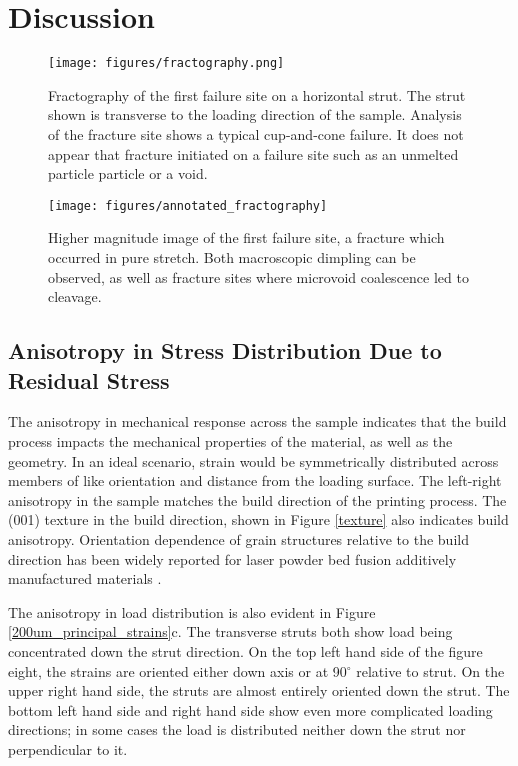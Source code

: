 \section{Discussion}

\begin{figure*}
	\texttt{[image: figures/fractography.png]}
	\caption{Fractography of the first failure site on a horizontal strut. The strut shown is transverse to the loading direction of the sample. Analysis of the fracture site shows a typical cup-and-cone failure. It does not appear that fracture initiated on a failure site such as an unmelted particle particle or a void.}
	\label{fractography}
\end{figure*}

\begin{figure*}
	\texttt{[image: figures/annotated\_fractography]}
	\caption{Higher magnitude image of the first failure site, a fracture which occurred in pure stretch. Both macroscopic dimpling can be observed, as well as fracture sites where microvoid coalescence led to cleavage.}
	\label{annofrac}
\end{figure*}

\subsection{Anisotropy in Stress Distribution Due to Residual Stress}
The anisotropy in mechanical response across the sample indicates that the build process impacts the mechanical properties of the material, as well as the geometry. In an ideal scenario, strain would be symmetrically distributed across members of like orientation and distance from the loading surface. The left-right anisotropy in the sample matches the build direction of the printing process. The (001) texture in the build direction, shown in Figure \ref{texture} also indicates build anisotropy. Orientation dependence of grain structures relative to the build direction has been widely reported for laser powder bed fusion additively manufactured materials \cite{Hayes2017,Keist2020, Todaro2020}.

The anisotropy in load distribution is also evident in Figure \ref{200um_principal_strains}c. The transverse struts both show load being concentrated down the strut direction. On the top left hand side of the figure eight, the strains are oriented either down axis or at 90$^\circ$ relative to strut. On the upper right hand side, the struts are almost entirely oriented down the strut. The bottom left hand side and right hand side show even more complicated loading directions; in some cases the load is distributed neither down the strut nor perpendicular to it. 

